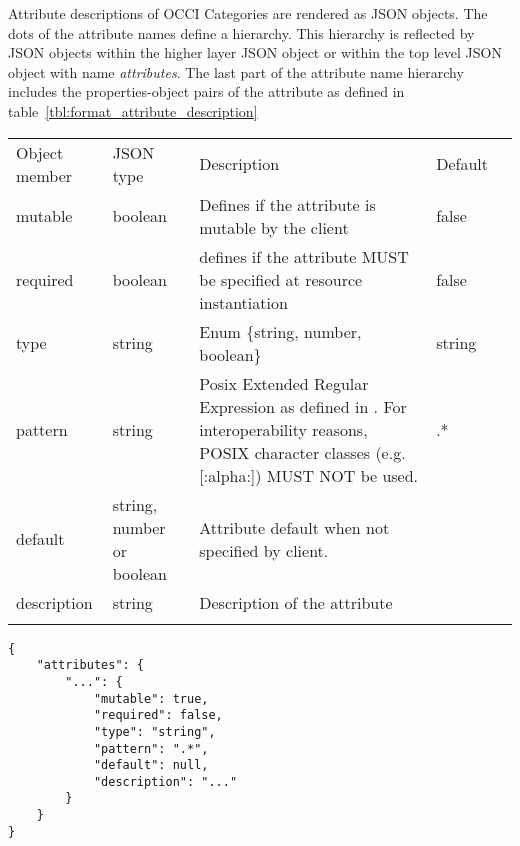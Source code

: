 \documentclass[10pt,a4paper]{article}
\begin{document}

Attribute descriptions of OCCI Categories are rendered as JSON objects. 
The dots of the attribute names define a hierarchy. This hierarchy is reflected 
by JSON objects within the higher layer JSON object or within the top level 
JSON object with name {\em attributes}. The last part of the attribute name
 hierarchy includes the properties-object pairs of the attribute as defined 
 in table~\ref{tbl:format_attribute_description}

 {
    \begin{tabularx}{\textwidth}{llXll}
    \toprule
    Object member & JSON type & Description & Default \\
    \colrule
    mutable & boolean & Defines if the attribute is mutable by the client &
false \\
    required & boolean & defines if the attribute MUST be specified at resource
instantiation & false \\
    type & string & Enum \{string, number, boolean\}
    & string \\
    pattern & string & Posix Extended Regular Expression as defined in
\cite{iso9945:2009}. For interoperability reasons, POSIX character classes (e.g.
[:alpha:]) MUST NOT be used. & .* \\
    default & string, number or boolean & Attribute default when not specified
by client. & \\
    description & string & Description of the attribute & \\
    \botrule
    \end{tabularx}
}
\begin{verbatim}
{
    "attributes": {
        "...": {
            "mutable": true,
            "required": false,
            "type": "string",
            "pattern": ".*",
            "default": null,
            "description": "..."
        }
    }
}
\end{verbatim}
\end{document}
